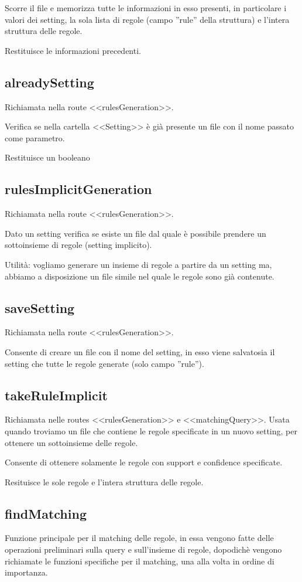 \documentclass[a4paper]{article}
\begin{document}
Scorre il file e memorizza tutte le informazioni in esso presenti, in particolare i valori dei setting, la sola lista di regole (campo ''rule'' della struttura) e l'intera struttura delle regole.

Restituisce le informazioni precedenti.

\subsection{alreadySetting}
Richiamata nella route <<rulesGeneration>>.

Verifica se nella cartella <<Setting>> è già presente un file con il nome passato come parametro.

Restituisce un booleano

\subsection{rulesImplicitGeneration}
Richiamata nella route <<rulesGeneration>>.

Dato un setting verifica se esiste un file  dal quale è possibile prendere un sottoinsieme di regole (setting implicito).

Utilità: vogliamo generare un insieme di regole a partire da un setting ma, abbiamo a disposizione un file simile nel quale le regole sono già contenute.

\subsection{saveSetting}
Richiamata nella route <<rulesGeneration>>.

Consente di creare un file con il nome del setting, in esso viene salvatosia il setting che tutte le regole generate (solo campo ''rule'').

\subsection{takeRuleImplicit}
Richiamata nelle routes <<rulesGeneration>> e <<matchingQuery>>. Usata quando troviamo un file che contiene le regole specificate in un nuovo setting, per ottenere un sottoinsieme delle regole.

Consente di ottenere solamente le regole con support e confidence specificate.

Resituisce le sole regole e l'intera struttura delle regole.

\subsection{findMatching}
Funzione principale per il matching delle regole, in essa vengono fatte delle operazioni preliminari sulla query e sull'insieme di regole, dopodichè vengono richiamate le funzioni specifiche per il matching, una alla volta in ordine di importanza.
\end{document}

